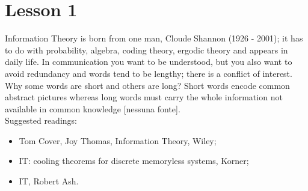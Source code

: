 \section{Lesson 1}

Information Theory is born from one man, Cloude Shannon (1926 - 2001); it has to do with probability, algebra, coding theory, ergodic theory and appears in daily life. In communication you want to be understood, but you also want to avoid redundancy and words tend to be lengthy; there is a conflict of interest. Why some words are short and others are long? Short words encode common abstract pictures whereas long words must carry the whole information not available in common knowledge [nessuna fonte].\\

Suggested readings: 
\begin{itemize}
	\item Tom Cover, Joy Thomas, Information Theory, Wiley;
	\item IT: cooling theorems for discrete memoryless systems, Korner;
	\item IT, Robert Ash.
\end{itemize}
